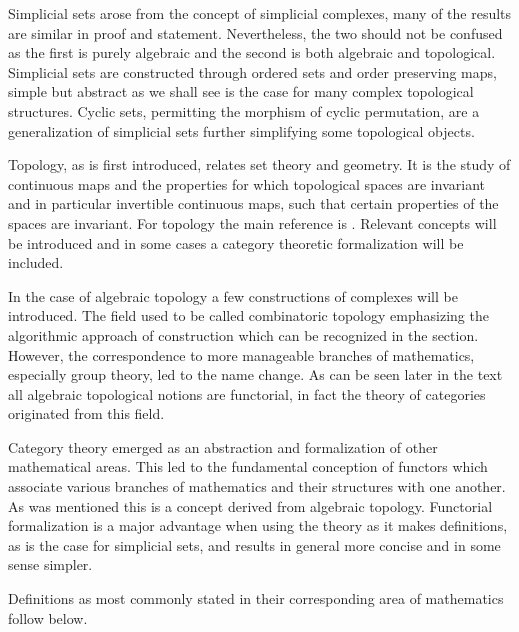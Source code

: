 \documentclass[../../main.tex]{subfiles}
\begin{document}
    Simplicial sets arose from the concept of simplicial complexes, many of the results are similar in proof and statement. Nevertheless, the two should not be confused as the first is purely algebraic and the second is both algebraic and topological. Simplicial sets are constructed through ordered sets and order preserving maps, simple but abstract as we shall see is the case for many complex topological structures. Cyclic sets, permitting the morphism of cyclic permutation, are a generalization of simplicial sets further simplifying some topological objects.
    
    Topology, as is first introduced, relates set theory and geometry. It is the study of continuous maps and the properties for which topological spaces are invariant and in particular invertible continuous maps, such that certain properties of the spaces are invariant. For topology the main reference is \cite{armstrong-basictop}. Relevant concepts will be introduced and in some cases a category theoretic formalization will be included. 
    
    In the case of algebraic topology a few constructions of complexes will be introduced. The field used to be called combinatoric topology emphasizing the algorithmic approach of construction which can be recognized in the section. However, the correspondence to more manageable branches of mathematics, especially group theory, led to the name change. As can be seen later in the text all algebraic topological notions are functorial, in fact the theory of categories originated from this field. 
    
    Category theory emerged as an abstraction and formalization of other mathematical areas. This led to the fundamental conception of functors which associate various branches of mathematics and their structures with one another. As was mentioned this is a concept derived from algebraic topology. Functorial formalization is a major advantage when using the theory as it makes definitions, as is the case for simplicial sets, and results in general more concise and in some sense simpler. 
    
    Definitions as most commonly stated in their corresponding area of mathematics follow below. 
    
\end{document}
